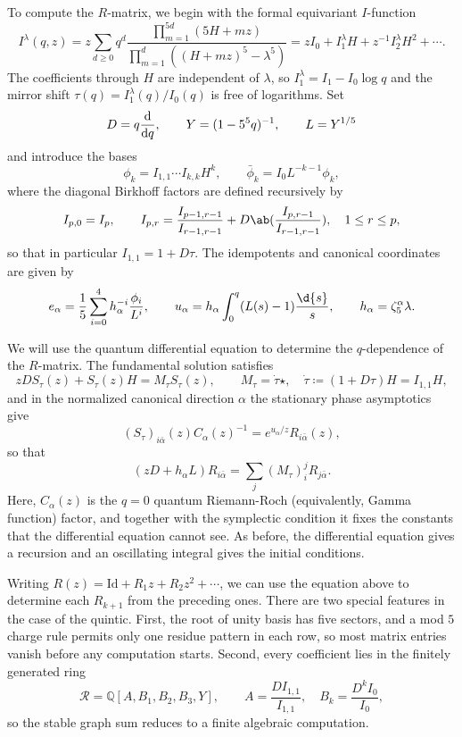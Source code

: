 \documentclass{amsart}
\theoremstyle{definition}
\theoremstyle{remark}
\theoremstyle{plain}
\theoremstyle{definition}
\theoremstyle{remark}
\newcommand{\Q}{\mathbb{Q}}
\newcommand{\mc}[1]{\mathcal{#1}}
\newcommand{\mr}[1]{\mathrm{#1}}
\newcommand{\1}{\mathbf{1}}
\newcommand{\2}{\mathbf{2}}
\newcommand{\3}{\mathbf{3}}
\begin{document}
To compute the \(R\)-matrix, we begin with the formal equivariant \(I\)-function
\[ I^{\lambda}(q,z) = z\sum_{d\geq0}q^d \frac{\prod_{m=1}^{5d}(5H+mz)}{\prod_{m=1}^d ((H+mz)^5 - \lambda^5)} = zI_0 + I_1^{\lambda}H + z^{-1}I_2^{\lambda}H^2 + \cdots. \]
The coefficients through \(H\) are independent of \(\lambda\), so \(I_1^{\lambda} = I_1 - I_0 \log q\) and the mirror shift \(\tau(q) = I_1^{\lambda}(q)/I_0(q)\) is free of logarithms. Set
\[ D = q\odv{}{q}, \qquad Y = (1-5^5q)^{-1}, \qquad L = Y^{1/5} \]
and introduce the bases
\[ \phi_k = I_{1,1}\cdots I_{k,k}H^k, \qquad \bar{\phi}_k = I_0 L^{-k-1}\phi_k, \]
where the diagonal Birkhoff factors are defined recursively by
\[ I_{p,0} = I_p, \qquad I_{p,r} = \frac{I_{p-1,r-1}}{I_{r-1,r-1}} + D \ab( \frac{I_{p,r-1}}{I_{r-1,r-1}}), \quad 1 \leq r \leq p, \]
so that in particular \(I_{1,1} = 1+D\tau\). The idempotents and canonical coordinates are given by
\[ e_{\alpha} = \frac{1}{5}\sum_{i=0}^4 h_{\alpha}^{-i}\frac{\phi_i}{L^i}, \qquad u_{\alpha} = h_{\alpha}\int_0^q (L(s)-1)\frac{\d{s}}{s}, \qquad h_{\alpha} = \zeta_5^{\alpha}\lambda. \]

We will use the quantum differential equation to determine the \(q\)-dependence of the \(R\)-matrix. The fundamental solution satisfies
\[ zDS_{\tau}(z) + S_{\tau}(z)H = M_{\tau}S_{\tau}(z), \qquad M_{\tau} = \dot{\tau}\star, \quad \dot{\tau} \coloneqq (1+D\tau)H = I_{1,1}H, \]
and in the normalized canonical direction \(\alpha\) the stationary phase asymptotics give
\[ (S_{\tau})_{i\bar{\alpha}}(z)C_{\alpha}(z)^{-1} = e^{u_{\alpha}/z}R_{i\bar{\alpha}}(z), \]
so that
\[ (zD+h_{\alpha}L)R_{i\bar{\alpha}} = \sum_j (M_{\tau})_i^j R_{j\bar{\alpha}}. \]
Here, \(C_{\alpha}(z)\) is the \(q=0\) quantum Riemann-Roch (equivalently, Gamma function) factor, and together with the symplectic condition it fixes the constants that the differential equation cannot see. As before, the differential equation gives a recursion and an oscillating integral gives the initial conditions.

Writing \(R(z) = \mr{Id} + R_1 z + R_2 z^2 + \cdots\), we can use the equation above to determine each \(R_{k+1}\) from the preceding ones. There are two special features in the case of the quintic. First, the root of unity basis has five sectors, and a mod \(5\) charge rule permits only one residue pattern in each row, so most matrix entries vanish before any computation starts. Second, every coefficient lies in the finitely generated ring
\[ \mc{R} = \Q[A,B_1,B_2,B_3,Y], \qquad A = \frac{DI_{1,1}}{I_{1,1}}, \quad B_k = \frac{D^k I_0}{I_0}, \]
so the stable graph sum reduces to a finite algebraic computation.
\end{document}
